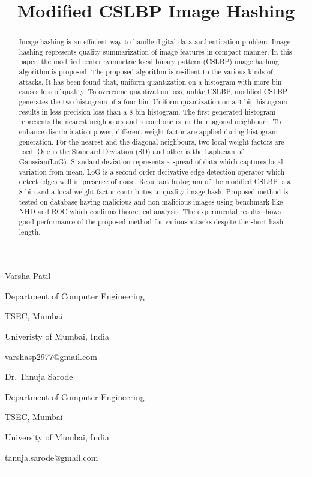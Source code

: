 \documentclass[12pt,a4paper]{jihmsp}
\title[Modified CSLBP Image Hashing]
{Modified CSLBP Image Hashing}
\author[V. Patil and T. Sarode]{}
\begin{document}
	
	\maketitle
	
	\centerline{Varsha Patil}
	\medskip
	{\footnotesize
		\centerline{Department of Computer Engineering}
		\centerline{TSEC, Mumbai}
		\centerline{Univeristy of Mumbai, India}
		\centerline{varshasp2977@gmail.com}
	\medskip
	
	\centerline{Dr. Tanuja Sarode}
	\medskip
	{\footnotesize
		\centerline{Department of Computer Engineering}
		\centerline{TSEC, Mumbai}
		\centerline{University of Mumbai, India}
		\centerline{tanuja.sarode@gmail.com}
	\medskip
	
	
	
	
	
	\rule{15cm}{1pt}
	
	\begin{abstract}
		
	Image hashing is an efficient way to handle digital data authentication problem. Image hashing represents quality summarization of image features in compact manner. In this paper, the modified center symmetric local binary pattern (CSLBP) image hashing algorithm is proposed. The proposed algorithm is resilient to the various kinds of attacks. It has been found that, uniform quantization on a histogram with more bin causes loss of quality. To overcome quantization loss, unlike CSLBP, modified CSLBP generates the two histogram of a four bin. Uniform quantization on a $4$ bin histogram results in less precision loss than a 8 bin histogram. The first generated histogram represents the nearest neighbours and second one is for the diagonal neighbours. To enhance discrimination power, different weight factor are applied during histogram generation. For the nearest and the diagonal neighbours, two local weight factors are used. One is the Standard Deviation (SD) and other is the Laplacian of Gaussian(LoG). Standard deviation represents a spread of data which captures local variation from mean. LoG is a second order derivative edge detection operator which detect edges well in presence of noise. Resultant histogram of the modified CSLBP is a $8$ bin and a local weight factor contributes to quality image hash. Proposed method is tested on database having malicious and non-malicious images using benchmark like NHD and ROC which confirms theoretical analysis. The experimental results shows good performance of the proposed method for various attacks despite the short hash length.
	

\end{abstract}}}
\end{document}
